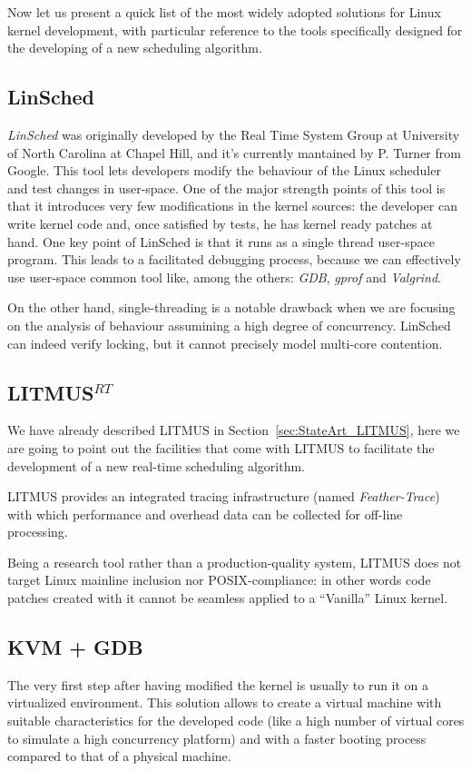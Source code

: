Now let us present a quick list of the most widely adopted solutions for Linux kernel development,
with particular reference to the tools specifically designed for the developing of a new 
scheduling algorithm.

\subsection{LinSched\label{LinSched}}
\emph{LinSched} was originally developed by the Real Time System Group at University of
North Carolina at Chapel Hill, and it's currently mantained by P. Turner from Google. This
tool lets developers modify the behaviour of the Linux scheduler and test changes in user-space.
One of the major strength points of this tool is that it introduces very few modifications
in the kernel sources: the developer can write kernel code and, once satisfied by tests,
he has kernel ready patches at hand. One key point of LinSched is that it runs as a single
thread user-space program. This leads to a facilitated debugging process, because we can
effectively use user-space common tool like, among the others: \textit{GDB}, \textit{gprof} 
and \textit{Valgrind}.

On the other hand, single-threading is a notable drawback when we are focusing on the 
analysis of behaviour assumining a high degree of concurrency. LinSched can indeed verify 
locking, but it cannot precisely model multi-core contention.

\subsection{LITMUS$^{RT}$\label{LITMUS}}
We have already described LITMUS in Section~\ref{sec:StateArt_LITMUS}, here we are going
to point out the facilities that come with LITMUS to facilitate the development of a 
new real-time scheduling algorithm.

LITMUS provides an integrated tracing infrastructure (named \emph{Feather-Trace}) with which performance
and overhead data can be collected for off-line processing.

Being a research tool rather than a production-quality system, LITMUS does not target
Linux mainline inclusion nor POSIX-compliance: in other words code patches created with it
cannot be seamless applied to a ``Vanilla'' Linux kernel.

\subsection{KVM + GDB\label{KVM_GDB}}
The very first step after having modified the kernel is usually to run it on a virtualized
environment. This solution allows to create a virtual machine with suitable characteristics
for the developed code (like a high number of virtual cores to simulate a high concurrency
platform) and with a faster booting process compared to that of a physical machine.

